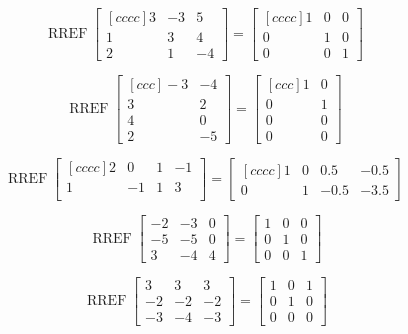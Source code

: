 \documentclass{article}
\DeclareMathOperator{\RREF}{RREF}
\begin{document}
$$\RREF \begin{bmatrix}[cccc]
3 & -3 & 5 \\
1 & 3 & 4 \\
2 & 1 & -4
\end{bmatrix}=\begin{bmatrix}[cccc]
1 & 0 & 0 \\
0 & 1 & 0 \\
0 & 0 &1
\end{bmatrix} $$

\[\RREF \begin{bmatrix}[ccc]
-3 & -4 \\
3 &2 \\
4 & 0 \\
2 & -5
\end{bmatrix}
= \begin{bmatrix}[ccc]
1&0\\
0 &1\\
0 & 0\\
0&0
\end{bmatrix}
 \]
 
 
 \[\RREF \begin{bmatrix}[cccc]
2 & 0 & 1 & -1 \\
1 & -1 & 1 &3\\
\end{bmatrix}
= \begin{bmatrix}[cccc]
1 & 0 & 0.5 & -0.5\\
0 & 1 & -0.5 & -3.5
\end{bmatrix}
 \]
 
 
 
 
 \[\
\RREF \begin{bmatrix}-2 & -3 & 0 \\ -5 & -5 & 0 \\ 3 & -4 & 4\end{bmatrix}
= \begin{bmatrix} 1 & 0 & 0 \\ 0 & 1 & 0 \\ 0 & 0 & 1 \end{bmatrix}
\]

\[\
\RREF \begin{bmatrix}3 & 3 & 3 \\ -2 & -2 & -2 \\ -3 & -4 & -3\end{bmatrix}
= \begin{bmatrix} 1 & 0 & 1 \\ 0 & 1 & 0 \\ 0 & 0 & 0 \end{bmatrix}
\]
\end{document}
